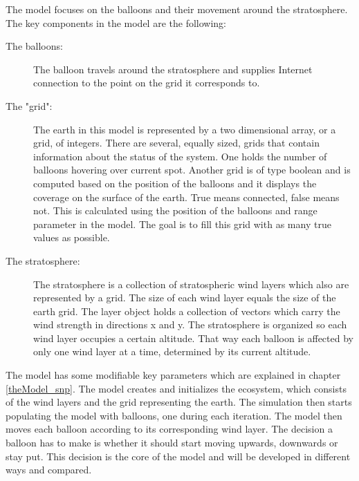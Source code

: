 The model focuses on the balloons and their movement around the stratosphere. The key components in the model are the following:

\begin{description}
    \item[The balloons:] The balloon travels around the stratosphere and supplies Internet connection to the point on the grid it corresponds to. 
    \item[The "grid":] The earth in this model is represented by a two dimensional array, or a grid, of integers. There are several, equally sized, grids that contain information about the status of the system. One holds the number of balloons hovering over current spot. Another grid is of type boolean and is computed based on the position of the balloons and it displays the coverage on the surface of the earth. True means connected, false means not. This is calculated using the position of the balloons and range parameter in the model. The goal is to fill this grid with as many true values as possible. 
    \item[The stratosphere:] The stratosphere is a collection of stratospheric wind layers which also are represented by a grid. The size of each wind layer equals the size of the earth grid. The layer object holds a collection of vectors which carry the wind strength in directions x and y. The stratosphere is organized so each wind layer occupies a certain altitude. That way each balloon is affected by only one wind layer at a time, determined by its current altitude. 
\end{description}

The model has some modifiable key parameters which are explained in chapter \ref{theModel_snp}. The model creates and initializes the ecosystem, which consists of the wind layers and the grid representing the earth. The simulation then starts populating the model with balloons, one during each iteration. The model then moves each balloon according to its corresponding wind layer. The decision a balloon has to make is whether it should start moving upwards, downwards or stay put. This decision is the core of the model and will be developed in different ways and compared.


